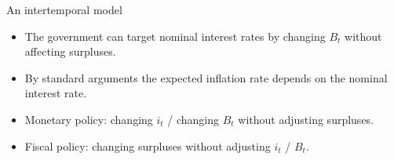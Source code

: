 \documentclass[11pt,xcolor={dvipsnames},aspectratio=159,hyperref={pdftex,pdfpagemode=UseNone,hidelinks,pdfdisplaydoctitle=true},usepdftitle=false]{beamer}
\begin{document}
\begin{frame}{An intertemporal model}
    \begin{itemize}
            \item The government can target nominal interest rates by changing $B_t$ without affecting surpluses. 
            \item By standard arguments the expected inflation rate depends on the nominal interest rate. 
            \item Monetary policy: changing $i_t$ / changing $B_t$ without adjusting surpluses. 
            \item Fiscal policy: changing surpluses without adjusting $i_t$ / $B_t$.
        \end{itemize}
    \end{frame}    
\end{document}
